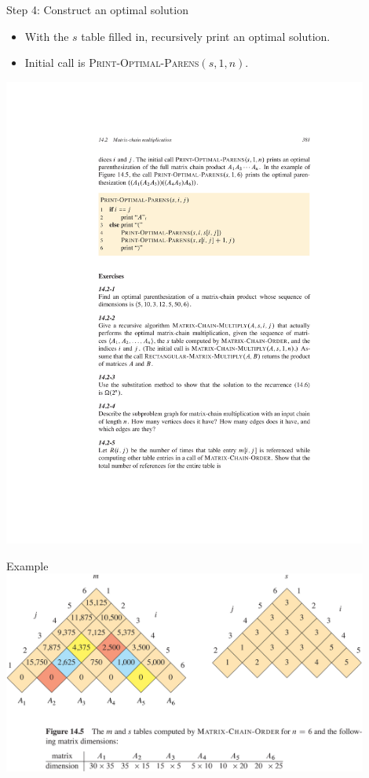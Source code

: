 \documentclass[aspectratio=169]{beamer}
\begin{document}
\begin{frame}{Step 4: Construct an optimal solution}
    \begin{itemize}
        \item With the $s$ table filled in, recursively print an optimal solution.
        \item Initial call is \textsc{Print-Optimal-Parens}$(s, 1, n)$.
    \end{itemize}
    \vspace{5mm}

    \centering
    \includegraphics[width=0.9\textwidth, trim={4cm 17cm 5cm 6.75cm}, clip]{figures/p381}
\end{frame}

\begin{frame}{Example}
    \centering
    \includegraphics[width=0.9\textwidth]{figures/rmp2}
\end{frame}
\end{document}
